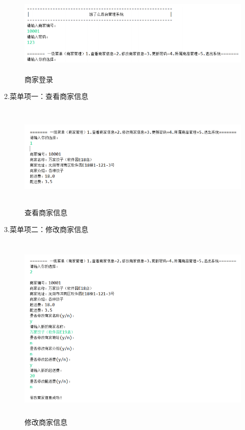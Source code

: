 \begin{figure}[H]
    \centering
    \includegraphics[width=15cm,height=4cm]{figures/jdbc6.png}
    \caption{商家登录}
\end{figure}

\noindent
2.菜单项一：查看商家信息

\begin{figure}[H]
    \centering
    \includegraphics[width=15cm,height=5cm]{figures/jdbc7.png}
    \caption{查看商家信息}
\end{figure}

\noindent
3.菜单项二：修改商家信息

\begin{figure}[H]
    \centering
    \includegraphics[width=15cm,height=9cm]{figures/jdbc8.png}
    \caption{修改商家信息}
\end{figure}

